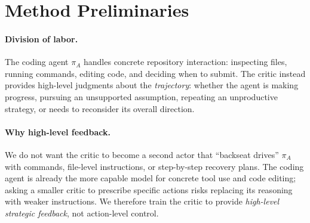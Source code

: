 
\section{Method Preliminaries}
\label{critic:app:method_prelim}

\paragraph{Division of labor.} The coding agent $\pi_A$ handles concrete repository interaction: inspecting files, running commands, editing code, and deciding when to submit. The critic instead provides high-level judgments about the \emph{trajectory}: whether the agent is making progress, pursuing an unsupported assumption, repeating an unproductive strategy, or needs to reconsider its overall direction.

\paragraph{Why high-level feedback.} We do not want the critic to become a second actor that ``backseat drives'' $\pi_A$ with commands, file-level instructions, or step-by-step recovery plans. The coding agent is already the more capable model for concrete tool use and code editing; asking a smaller critic to prescribe specific actions risks replacing its reasoning with weaker instructions. We therefore train the critic to provide \emph{high-level strategic feedback}, not action-level control.

